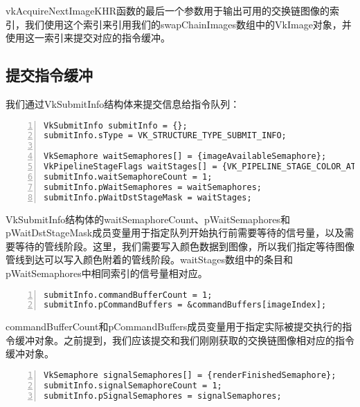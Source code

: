 \documentclass{ctexart}
\begin{document}
vkAcquireNextImageKHR函数的最后一个参数用于输出可用的交换链图像的索引，我们使用这个索引来引用我们的swapChainImages数组中的VkImage对象，并使用这一索引来提交对应的指令缓冲。

\subsection{提交指令缓冲}

我们通过VkSubmitInfo结构体来提交信息给指令队列：

\begin{lstlisting}[language={[ANSI]C},keywordstyle=\color{blue!70},commentstyle=\color{red!50!green!50!blue!50},frame=shadowbox, rulesepcolor=\color{red!20!green!20!blue!20},basicstyle=\small,numbers=left, numberstyle=\tiny,breaklines=true]
VkSubmitInfo submitInfo = {};
submitInfo.sType = VK_STRUCTURE_TYPE_SUBMIT_INFO;

VkSemaphore waitSemaphores[] = {imageAvailableSemaphore};
VkPipelineStageFlags waitStages[] = {VK_PIPELINE_STAGE_COLOR_ATTACHMENT_OUTPUT_BIT};
submitInfo.waitSemaphoreCount = 1;
submitInfo.pWaitSemaphores = waitSemaphores;
submitInfo.pWaitDstStageMask = waitStages;
\end{lstlisting}

VkSubmitInfo结构体的waitSemaphoreCount、pWaitSemaphores和pWaitDstStageMask成员变量用于指定队列开始执行前需要等待的信号量，以及需要等待的管线阶段。这里，我们需要写入颜色数据到图像，所以我们指定等待图像管线到达可以写入颜色附着的管线阶段。waitStages数组中的条目和pWaitSemaphores中相同索引的信号量相对应。

\begin{lstlisting}[language={[ANSI]C},keywordstyle=\color{blue!70},commentstyle=\color{red!50!green!50!blue!50},frame=shadowbox, rulesepcolor=\color{red!20!green!20!blue!20},basicstyle=\small,numbers=left, numberstyle=\tiny,breaklines=true]
submitInfo.commandBufferCount = 1;
submitInfo.pCommandBuffers = &commandBuffers[imageIndex];
\end{lstlisting}

commandBufferCount和pCommandBuffers成员变量用于指定实际被提交执行的指令缓冲对象。之前提到，我们应该提交和我们刚刚获取的交换链图像相对应的指令缓冲对象。

\begin{lstlisting}[language={[ANSI]C},keywordstyle=\color{blue!70},commentstyle=\color{red!50!green!50!blue!50},frame=shadowbox, rulesepcolor=\color{red!20!green!20!blue!20},basicstyle=\small,numbers=left, numberstyle=\tiny,breaklines=true]
VkSemaphore signalSemaphores[] = {renderFinishedSemaphore};
submitInfo.signalSemaphoreCount = 1;
submitInfo.pSignalSemaphores = signalSemaphores;
\end{lstlisting}
\end{document}
